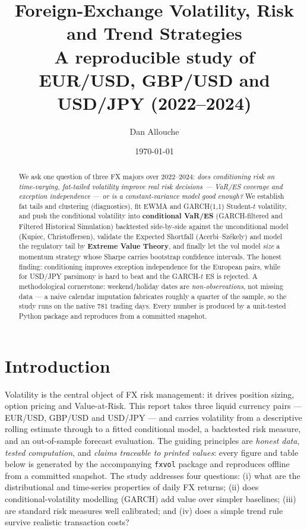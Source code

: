 \documentclass[11pt,a4paper]{article}
\title{\textbf{Foreign-Exchange Volatility, Risk and Trend Strategies}\\[2pt]
\large A reproducible study of EUR/USD, GBP/USD and USD/JPY (2022--2024)}
\author{Dan Allouche}
\date{\today}
\begin{document}
\maketitle
\vspace{-1.2em}
\begin{abstract}
\noindent We ask one question of three FX majors over 2022--2024: \emph{does conditioning risk on
time-varying, fat-tailed volatility improve real risk decisions --- VaR/ES coverage and exception
independence --- or is a constant-variance model good enough?} We establish fat tails and clustering
(diagnostics), fit EWMA and GARCH(1,1) Student-$t$ volatility, and push the conditional volatility into
\textbf{conditional VaR/ES} (GARCH-filtered and Filtered Historical Simulation) backtested side-by-side
against the unconditional model (Kupiec, Christoffersen), validate the Expected Shortfall
(Acerbi--Székely) and model the regulatory tail by \textbf{Extreme Value Theory}, and finally let the vol
model \emph{size} a momentum strategy whose Sharpe carries bootstrap confidence intervals. The honest
finding: conditioning improves exception independence for the European pairs, while for USD/JPY parsimony
is hard to beat and the GARCH-$t$ ES is rejected. A methodological cornerstone: weekend/holiday dates are
\emph{non-observations}, not missing data --- a naive calendar imputation fabricates roughly a quarter of
the sample, so the study runs on the native 781 trading days. Every number is produced by a unit-tested
Python package and reproduces from a committed snapshot.
\end{abstract}
\tableofcontents
\vspace{0.5em}

\section{Introduction}
Volatility is the central object of FX risk management: it drives position sizing, option pricing
and Value-at-Risk. This report takes three liquid currency pairs --- EUR/USD, GBP/USD and USD/JPY ---
and carries volatility from a descriptive rolling estimate through to a fitted conditional model, a
backtested risk measure, and an out-of-sample forecast evaluation. The guiding principles are
\emph{honest data}, \emph{tested computation}, and \emph{claims traceable to printed values}: every
figure and table below is generated by the accompanying \texttt{fxvol} package and reproduces offline
from a committed snapshot.
The study addresses four questions: (i) what are the distributional and time-series properties of
daily FX returns; (ii) does conditional-volatility modelling (GARCH) add value over simpler baselines;
(iii) are standard risk measures well calibrated; and (iv) does a simple trend rule survive realistic
transaction costs?
\end{document}
